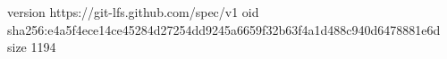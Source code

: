 version https://git-lfs.github.com/spec/v1
oid sha256:e4a5f4ece14ce45284d27254dd9245a6659f32b63f4a1d488c940d6478881e6d
size 1194
